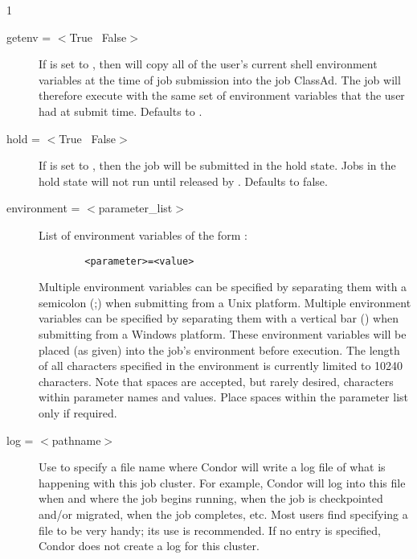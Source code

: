 \begin{ManPage}{\label{man-condor-submit}}{1}
\begin{description}

\item[getenv = $<$True \Bar\ False$>$] If  is set to
, then  will copy all of the user's current
shell environment variables at the time of job submission into the job
ClassAd. The job will therefore execute with the same set of environment
variables that the user had at submit time. Defaults to .


\item[hold = $<$True \Bar\ False$>$] If  is set to
, then the job will be submitted in the hold state.  Jobs in
the hold state will not run until released by .
Defaults to false.


\item[environment = $<$parameter\_list$>$] List of environment variables
of the form :
\begin{verbatim}
        <parameter>=<value>
\end{verbatim}
Multiple environment variables can be specified by separating them with a
semicolon (;) when submitting from a Unix platform.
Multiple environment variables can be specified by separating them with a
vertical bar (\Bar) when submitting from a Windows platform.
These environment variables will be placed (as given) into the
job's environment before execution. The length of all characters
specified in the environment is currently limited to 10240 characters.  
Note that spaces are accepted, but rarely desired,
characters within parameter names and values.
Place spaces within the parameter list only if required.


\item[log = $<$pathname$>$] Use  to specify a file name where
Condor will write a log file of what is happening with this job cluster.
For example, Condor will log into this file when and where the job
begins running, when the job is checkpointed and/or migrated, when the
job completes, etc. Most users find specifying a  file to be very
handy; its use is recommended. If no  entry is specified, 
Condor does not create a log for this cluster.


\end{description}
\end{ManPage}
